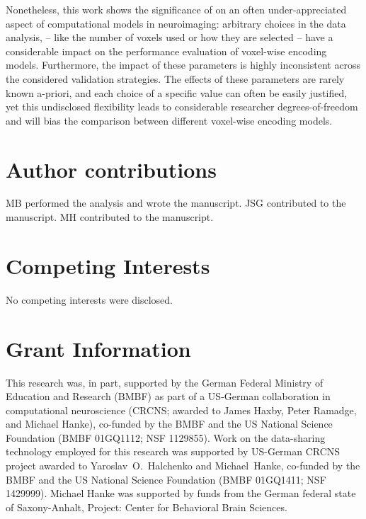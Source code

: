 Nonetheless, this work shows the significance of on an often under-appreciated aspect of
computational models in neuroimaging: arbitrary choices in the data analysis,
-- like the number of voxels used or how they are selected --
have a considerable impact on the performance evaluation of
voxel-wise encoding models. Furthermore, the impact of these parameters is
highly inconsistent across the considered validation strategies.
The effects of these parameters are rarely known a-priori, and each choice of a specific value can often
be easily justified, yet this undisclosed flexibility leads to considerable researcher degrees-of-freedom
\citep{SNS11,hong2019false} and will bias the comparison between different
voxel-wise encoding models.

\section*{Author contributions}

MB performed the analysis and wrote the manuscript.
JSG contributed to the manuscript.
MH contributed to the manuscript.


\section*{Competing Interests}

No competing interests were disclosed.

\section*{Grant Information}

This research was, in part, supported by the German Federal Ministry of
Education and Research (BMBF) as part of a US-German collaboration in
computational neuroscience (CRCNS; awarded to James Haxby, Peter Ramadge, and
Michael Hanke), co-funded by the BMBF and the US National Science Foundation
(BMBF 01GQ1112; NSF 1129855).  Work on the data-sharing technology employed for
this research was supported by US-German CRCNS project awarded to
Yaroslav~O.~Halchenko and Michael~Hanke, co-funded by the BMBF and the US
National Science Foundation (BMBF 01GQ1411; NSF 1429999).  Michael Hanke was
supported by funds from the German federal state of Saxony-Anhalt, Project:
Center for Behavioral Brain Sciences.


